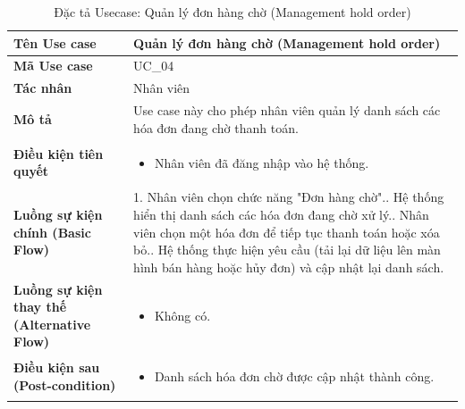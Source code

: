 \documentclass[12pt,a4paper]{report}
\begin{document}
\begin{longtable}{|>{\raggedright\arraybackslash\bfseries}p{4.5cm}|p{11cm}|}
\caption{Đặc tả Usecase: Quản lý đơn hàng chờ (Management hold order)} \label{tab:uc_manage_hold} \\
\hline
Tên Use case & Quản lý đơn hàng chờ (Management hold order) \\ \hline
Mã Use case & UC\_04 \\ \hline
Tác nhân & Nhân viên \\ \hline
Mô tả & Use case này cho phép nhân viên quản lý danh sách các hóa đơn đang chờ thanh toán. \\ \hline
Điều kiện tiên quyết & 
\begin{itemize}[leftmargin=*, nosep, topsep=0pt, partopsep=0pt]
    \item Nhân viên đã đăng nhập vào hệ thống.
\end{itemize} \\ \hline
Luồng sự kiện chính (Basic Flow) & 
1. Nhân viên chọn chức năng "Đơn hàng chờ".\newline
2. Hệ thống hiển thị danh sách các hóa đơn đang chờ xử lý.\newline
3. Nhân viên chọn một hóa đơn để tiếp tục thanh toán hoặc xóa bỏ.\newline
4. Hệ thống thực hiện yêu cầu (tải lại dữ liệu lên màn hình bán hàng hoặc hủy đơn) và cập nhật lại danh sách. \\ \hline
Luồng sự kiện thay thế (Alternative Flow) & 
\begin{itemize}[leftmargin=*, nosep, topsep=0pt, partopsep=0pt]
    \item Không có.
\end{itemize} \\ \hline
Điều kiện sau (Post-condition) & 
\begin{itemize}[leftmargin=*, nosep, topsep=0pt, partopsep=0pt]
    \item Danh sách hóa đơn chờ được cập nhật thành công.
\end{itemize} \\ \hline
\end{longtable}

\vspace{0.5cm}
\end{document}
